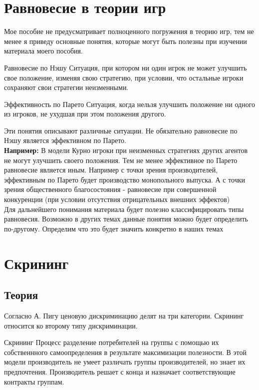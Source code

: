 \section{Равновесие в теории игр}
\indent\setlength{\parindent}{1em}Мое пособие не предусматривает полноценного погружения в теорию игр, тем не менее я приведу основные понятия, которые могут быть полезны при изучении материала моего пособия.
\begin{mybox}{Равновесие по Нэшу}
Ситуация, при котором ни один игрок не может улучшить свое положение, изменяя свою стратегию, при условии, что
остальные игроки сохраняют свои стратегии неизменными.
\end{mybox}
\begin{mybox}{Эффективность по Парето}
Ситуация, когда нельзя улучшить положение ни одного из игроков, не ухудшая при этом положения другого.
\end{mybox}
Эти понятия описывают различные ситуации. Не обязательно равновесие по Нэшу является эффективном по Парето. \smallskip\\ \indent\setlength{\parindent}{1em} \textbf{Например:} В модели Курно игроки при неизменных стратегиях других агентов не могут улучшить своего положения. Тем не менее эффективное по Парето равновесие является иным. Например с точки зрения производителей, эффективным по Парето будет производство монопольного выпуска. А с точки зрения общественного благосостояния - равновесие при совершенной конкуренции (при условии отсутствия отрицательных внешних эффектов)\smallskip\\\indent\setlength{\parindent}{1em} Для дальнейшего понимания материала будет полезно классифицировать типы равновесия. Возможно в других темах данные понятия можно будет определить по-другому. Определим что это будет значить конкретно в наших темах
\newpage
\section{Скрининг}
\subsection{Теория}
\indent\setlength{\parindent}{1em} Согласно А. Пигу ценовую дискриминацию делят на три категории. Скрининг относится
ко второму типу дискриминации.
\begin{mybox}{Скрининг}
Процесс разделение потребителей на группы с помощью их собственнного самоопределения в результате максимизации
полезности. В этой модели производитель не умеет различать группы производителей, но знает их предпочтения.
Производитель решает с конца и назначает соответствующие контракты группам.
\end{mybox}
